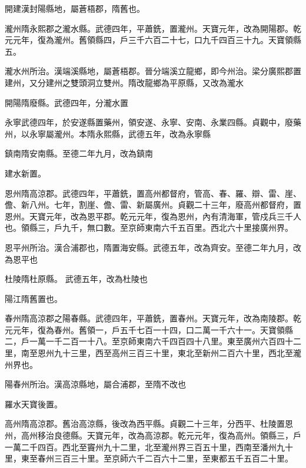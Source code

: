 \begin{pinyinscope}
 開建漢封陽縣地，屬蒼梧郡，隋舊也。



 瀧州隋永熙郡之瀧水縣。武德四年，平蕭銑，置瀧州。天寶元年，改為開陽郡。乾元元年，復為瀧州。舊領縣四，戶三千六百二十七，口九千四百三十九。天寶領縣五。



 瀧水州所治。漢端溪縣地，屬蒼梧郡。晉分端溪立龍鄉，即今州治。梁分廣熙郡置建州，又分建州之雙頭洞立雙州。隋改龍鄉為平原縣，又改為瀧水



 開陽隋廢縣。武德四年，分瀧水置



 永寧武德四年，於安遂縣置藥州，領安遂、永寧、安南、永業四縣。貞觀中，廢藥州，以永寧屬瀧州。本隋永熙縣，武德五年，改為永寧縣



 鎮南隋安南縣。至德二年九月，改為鎮南



 建水新置。



 恩州隋高涼郡。武德四年，平蕭銑，置高州都督府，管高、春、羅、辯、雷、崖、儋、新八州。七年，割崖、儋、雷、新屬廣州。貞觀二十三年，廢高州都督府，置恩州。天寶元年，改為恩平郡。乾元元年，復為恩州，內有清海軍，管戍兵三千人也。領縣三，戶九千，無口數。至京師東南六千五百里。西北六十里接廣州界。



 恩平州所治。漢合浦郡也，隋置海安縣。武德五年，改為齊安。至德二年九月，改為恩平也



 杜陵隋杜原縣。
 武德五年，改為杜陵也



 陽江隋舊置也。



 春州隋高涼郡之陽春縣。武德四年，平蕭銑，置春州。天寶元年，改為南陵郡。乾元元年，復為春州。舊領一，戶五千七百一十四，口二萬一千六十一。天寶領縣二，戶一萬一千二百一十八。至京師東南六千四百四十八里。東至廣州六百四十二里，南至恩州九十三里，西至高州三百三十里，東北至新州二百六十里，西北至瀧州界也。



 陽春州所治。漢高涼縣地，屬合浦郡，至隋不改也



 羅水天寶後置。



 高州隋高涼郡。舊治高涼縣，後改為西平縣。貞觀二十三年，分西平、杜陵置恩州，高州移治良德縣。天寶元年，改為高涼郡。乾元元年，復為高州。領縣三，戶一萬二千四百。西北至竇州九十二里，北至瀧州界三百五十里，西南至潘州九十里，東至春州三百三十里。至京師六千二百六十二里，至東都五千五百二十里。




\end{pinyinscope}
